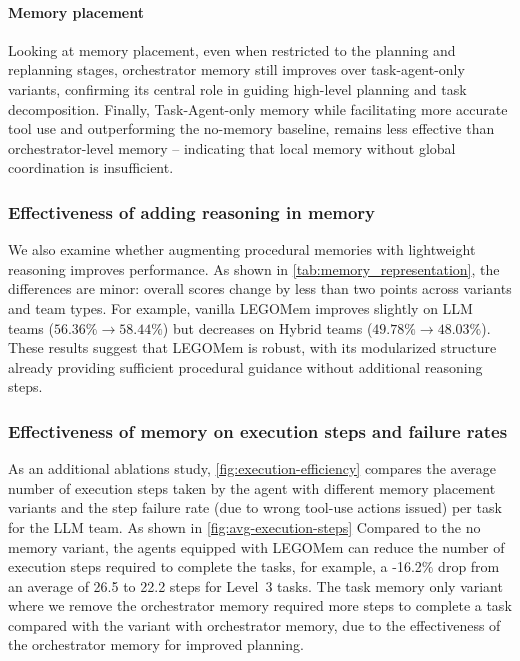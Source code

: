 \documentclass[sigconf]{aamas}
\newcommand{\legomem}{LEGOMem}
\begin{document}
\paragraph{Memory placement} Looking at memory placement, even when restricted to the planning and replanning stages, orchestrator memory still improves over task-agent-only variants, confirming its central role in guiding high-level planning and task decomposition. Finally, Task-Agent-only memory while facilitating more accurate tool use and outperforming the no-memory baseline, remains less effective than orchestrator-level memory -- indicating that local memory without global coordination is insufficient.




\subsubsection{Effectiveness of adding reasoning in memory}
We also examine whether augmenting procedural memories with lightweight reasoning improves performance. As shown in \autoref{tab:memory_representation}, the differences are minor: overall scores change by less than two points across variants and team types. For example, vanilla \legomem{} improves slightly on LLM teams ($56.36\%\rightarrow58.44\%$) but decreases on Hybrid teams ($49.78\%\rightarrow48.03\%$). These results suggest that \legomem{} is robust, with its modularized structure already providing sufficient procedural guidance without additional reasoning steps.

\subsubsection{Effectiveness of memory on execution steps and failure rates}
As an additional ablations study, \autoref{fig:execution-efficiency} compares the average number of execution steps taken by the agent with different memory placement variants and the step failure rate (due to wrong tool-use actions issued) per task for the LLM team. As shown in \autoref{fig:avg-execution-steps} Compared to the no memory variant, the agents equipped with \legomem{} can reduce the number of execution steps required to complete the tasks, for example, a -16.2$\%$ drop from an average of 26.5 to 22.2 steps for Level~3 tasks. The task memory only variant where we remove the orchestrator memory required more steps to complete a task compared with the variant with orchestrator memory, due to the effectiveness of the orchestrator memory for improved planning. 
\end{document}
